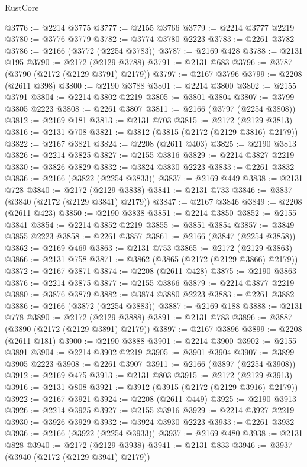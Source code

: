 \begin{lexlean}{RustCore}
\begin{coremodule}
@3776 := @2214 @3775
@3777 := @2155 @3766
@3779 := @2214 @3777 @2219
@3780 := @3776 @3779
@3782 := @3774 @3780 @2223
@3783 := @2261 @3782
@3786 := @2166 (@3772 (@2254 @3783))
@3787 := @2169 @428
@3788 := @2131 @195
@3790 := @2172 (@2129 @3788)
@3791 := @2131 @683
@3796 := @3787 (@3790 (@2172 (@2129 @3791) @2179))
@3797 := @2167 @3796
@3799 := @2208 (@2611 @398)
@3800 := @2190 @3788
@3801 := @2214 @3800
@3802 := @2155 @3791
@3804 := @2214 @3802 @2219
@3805 := @3801 @3804
@3807 := @3799 @3805 @2223
@3808 := @2261 @3807
@3811 := @2166 (@3797 (@2254 @3808))
@3812 := @2169 @181
@3813 := @2131 @703
@3815 := @2172 (@2129 @3813)
@3816 := @2131 @708
@3821 := @3812 (@3815 (@2172 (@2129 @3816) @2179))
@3822 := @2167 @3821
@3824 := @2208 (@2611 @403)
@3825 := @2190 @3813
@3826 := @2214 @3825
@3827 := @2155 @3816
@3829 := @2214 @3827 @2219
@3830 := @3826 @3829
@3832 := @3824 @3830 @2223
@3833 := @2261 @3832
@3836 := @2166 (@3822 (@2254 @3833))
@3837 := @2169 @449
@3838 := @2131 @728
@3840 := @2172 (@2129 @3838)
@3841 := @2131 @733
@3846 := @3837 (@3840 (@2172 (@2129 @3841) @2179))
@3847 := @2167 @3846
@3849 := @2208 (@2611 @423)
@3850 := @2190 @3838
@3851 := @2214 @3850
@3852 := @2155 @3841
@3854 := @2214 @3852 @2219
@3855 := @3851 @3854
@3857 := @3849 @3855 @2223
@3858 := @2261 @3857
@3861 := @2166 (@3847 (@2254 @3858))
@3862 := @2169 @469
@3863 := @2131 @753
@3865 := @2172 (@2129 @3863)
@3866 := @2131 @758
@3871 := @3862 (@3865 (@2172 (@2129 @3866) @2179))
@3872 := @2167 @3871
@3874 := @2208 (@2611 @428)
@3875 := @2190 @3863
@3876 := @2214 @3875
@3877 := @2155 @3866
@3879 := @2214 @3877 @2219
@3880 := @3876 @3879
@3882 := @3874 @3880 @2223
@3883 := @2261 @3882
@3886 := @2166 (@3872 (@2254 @3883))
@3887 := @2169 @188
@3888 := @2131 @778
@3890 := @2172 (@2129 @3888)
@3891 := @2131 @783
@3896 := @3887 (@3890 (@2172 (@2129 @3891) @2179))
@3897 := @2167 @3896
@3899 := @2208 (@2611 @181)
@3900 := @2190 @3888
@3901 := @2214 @3900
@3902 := @2155 @3891
@3904 := @2214 @3902 @2219
@3905 := @3901 @3904
@3907 := @3899 @3905 @2223
@3908 := @2261 @3907
@3911 := @2166 (@3897 (@2254 @3908))
@3912 := @2169 @475
@3913 := @2131 @803
@3915 := @2172 (@2129 @3913)
@3916 := @2131 @808
@3921 := @3912 (@3915 (@2172 (@2129 @3916) @2179))
@3922 := @2167 @3921
@3924 := @2208 (@2611 @449)
@3925 := @2190 @3913
@3926 := @2214 @3925
@3927 := @2155 @3916
@3929 := @2214 @3927 @2219
@3930 := @3926 @3929
@3932 := @3924 @3930 @2223
@3933 := @2261 @3932
@3936 := @2166 (@3922 (@2254 @3933))
@3937 := @2169 @480
@3938 := @2131 @828
@3940 := @2172 (@2129 @3938)
@3941 := @2131 @833
@3946 := @3937 (@3940 (@2172 (@2129 @3941) @2179))

\end{coremodule}
\end{lexlean}
